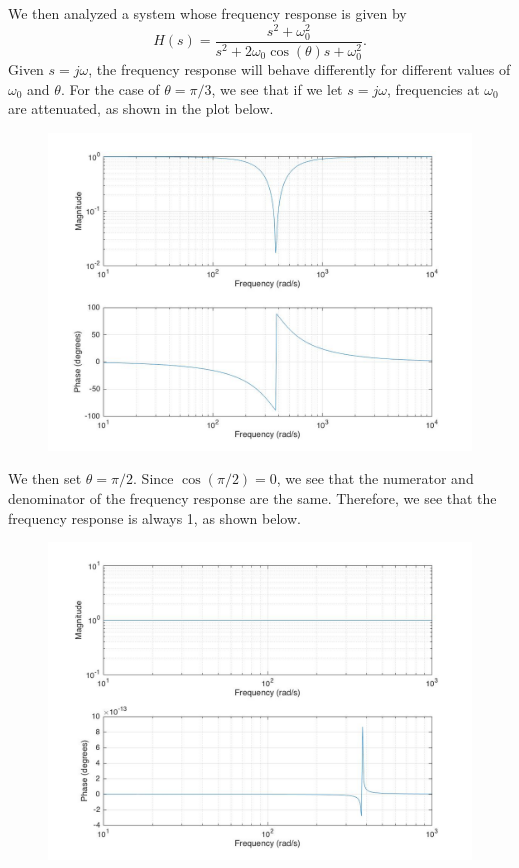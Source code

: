 \documentclass{article}
\begin{document}
We then analyzed a system whose frequency response is given by $$ H(s) = \frac{s^2 + \omega_0 ^2}{s^2 + 2\omega_0 \cos(\theta)s + \omega_0 ^2}.$$ Given $s = j\omega$, the frequency response will behave differently for different values of $\omega_0$ and $\theta$. For the case of $\theta  = \pi/3$, we see that if we let $s = j \omega$, frequencies at $\omega_0$ are attenuated, as shown in the plot below. 
\begin{figure}[!htbp]
\begin{minipage}{\linewidth}
\includegraphics[width = 1\linewidth, height = 0.5\textheight]{freq_reponse1.jpg}
\end{minipage}
\end{figure}
\FloatBarrier
We then set $\theta = \pi /2$. Since $\cos(\pi /2) = 0$, we see that the numerator and denominator of the frequency response are the same. Therefore, we see that the frequency response is always 1, as shown below.
\begin{figure}[!htbp]
\begin{minipage}{\linewidth}
\includegraphics[width = 1\linewidth, height = 0.5\textheight]{freq_response2.jpg}
\end{minipage}
\end{figure}
\FloatBarrier
\end{document}
